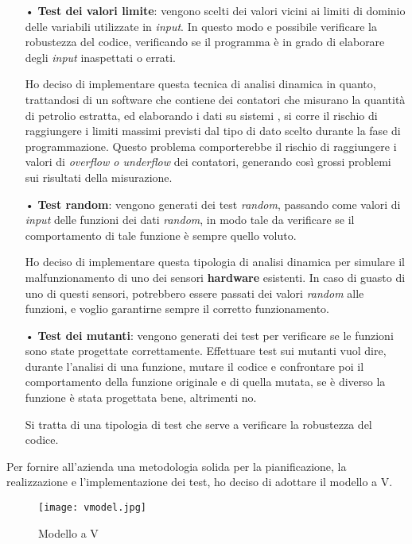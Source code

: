 \begin{itemize}
\item[•] \textbf{Test dei valori limite}: vengono scelti dei valori vicini ai limiti di dominio delle variabili utilizzate in \textit{input}. In questo modo e possibile verificare la robustezza del codice, verificando se il programma è in grado di elaborare degli \textit{input} inaspettati o errati.

Ho deciso di implementare questa tecnica di analisi dinamica in quanto, trattandosi di un software che contiene dei contatori che misurano la quantità di petrolio estratta, ed elaborando i dati su sistemi , si corre il rischio di raggiungere i limiti massimi previsti dal tipo di dato scelto durante la fase di programmazione. Questo problema comporterebbe il rischio di raggiungere i valori di \textit{overflow o underflow} dei contatori, generando così grossi problemi sui risultati della misurazione.

\item[•] \textbf{Test random}: vengono generati dei test \textit{random}, passando come valori di \textit{input} delle funzioni dei dati \textit{random}, in modo tale da verificare se il comportamento di tale funzione è sempre quello voluto.

Ho deciso di implementare questa tipologia di analisi dinamica per simulare il malfunzionamento di uno dei sensori \textbf{hardware} esistenti. In caso di guasto di uno di questi sensori, potrebbero essere passati dei valori \textit{random} alle funzioni, e voglio garantirne sempre il corretto funzionamento.

\item[•] \textbf{Test dei mutanti}: vengono generati dei test per verificare se le funzioni sono state progettate correttamente. Effettuare test sui mutanti vuol dire, durante l'analisi di una funzione, mutare il codice e confrontare poi il comportamento della funzione originale e di quella mutata, se è diverso la funzione è stata progettata bene, altrimenti no.

Si tratta di una tipologia di test che serve a verificare la robustezza del codice.
\end{itemize}

Per fornire all'azienda una metodologia solida per la pianificazione, la realizzazione e l'implementazione dei test, ho deciso di adottare il modello a V.

\begin{figure}[H]
  \centering
  \texttt{[image: vmodel.jpg]}
  \caption{Modello a V}
\end{figure}

